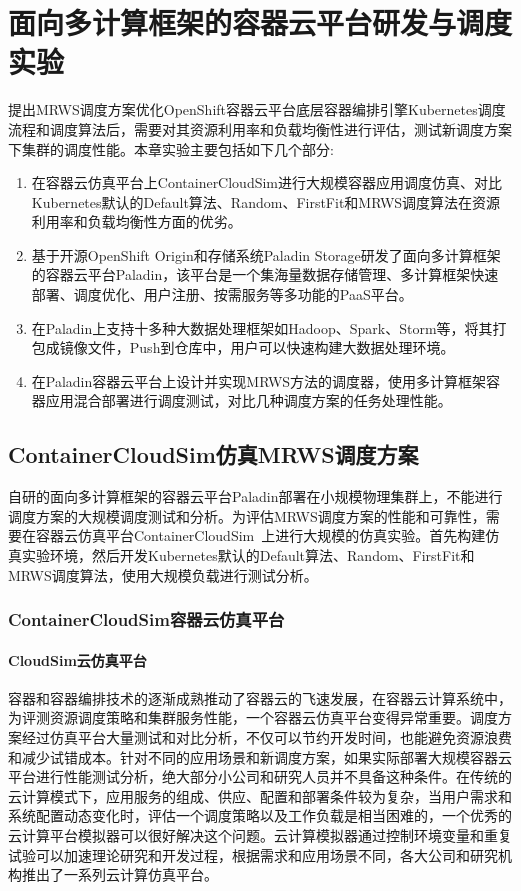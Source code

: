 \chapter{面向多计算框架的容器云平台研发与调度实验}
提出MRWS调度方案优化OpenShift容器云平台底层容器编排引擎Kubernetes调度流程和调度算法后，需要对其资源利用率和负载均衡性进行评估，测试新调度方案下集群的调度性能。本章实验主要包括如下几个部分:
\begin{enumerate}[(1)]
	\item 在容器云仿真平台上ContainerCloudSim进行大规模容器应用调度仿真、对比Kubernetes默认的Default算法、Random、FirstFit和MRWS调度算法在资源利用率和负载均衡性方面的优劣。
	\item 基于开源OpenShift Origin和存储系统Paladin Storage研发了面向多计算框架的容器云平台Paladin，该平台是一个集海量数据存储管理、多计算框架快速部署、调度优化、用户注册、按需服务等多功能的PaaS平台。
	\item 在Paladin上支持十多种大数据处理框架如Hadoop、Spark、Storm等，将其打包成镜像文件，Push到仓库中，用户可以快速构建大数据处理环境。
	\item 在Paladin容器云平台上设计并实现MRWS方法的调度器，使用多计算框架容器应用混合部署进行调度测试，对比几种调度方案的任务处理性能。
\end{enumerate}

\section{ContainerCloudSim仿真MRWS调度方案}
自研的面向多计算框架的容器云平台Paladin部署在小规模物理集群上，不能进行调度方案的大规模调度测试和分析。为评估MRWS调度方案的性能和可靠性，需要在容器云仿真平台ContainerCloudSim~\cite{Piraghaj2016ContainerCloudSim}上进行大规模的仿真实验。首先构建仿真实验环境，然后开发Kubernetes默认的Default算法、Random、FirstFit和MRWS调度算法，使用大规模负载进行测试分析。

\subsection{ContainerCloudSim容器云仿真平台}
\subsubsection{CloudSim云仿真平台}
容器和容器编排技术的逐渐成熟推动了容器云的飞速发展，在容器云计算系统中，为评测资源调度策略和集群服务性能，一个容器云仿真平台变得异常重要。调度方案经过仿真平台大量测试和对比分析，不仅可以节约开发时间，也能避免资源浪费和减少试错成本。针对不同的应用场景和新调度方案，如果实际部署大规模容器云平台进行性能测试分析，绝大部分小公司和研究人员并不具备这种条件。在传统的云计算模式下，应用服务的组成、供应、配置和部署条件较为复杂，当用户需求和系统配置动态变化时，评估一个调度策略以及工作负载是相当困难的，一个优秀的云计算平台模拟器可以很好解决这个问题。云计算模拟器通过控制环境变量和重复试验可以加速理论研究和开发过程，根据需求和应用场景不同，各大公司和研究机构推出了一系列云计算仿真平台。


